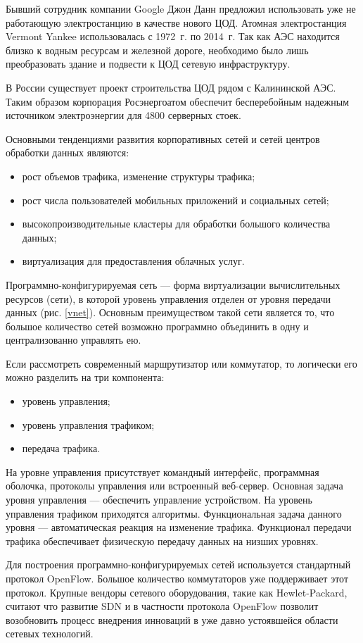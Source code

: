 Бывший сотрудник компании Google Джон Данн предложил использовать уже не работающую электростанцию в качестве нового ЦОД.
Атомная электростанция Vermont Yankee использовалась с 1972~г. по 2014~г.
Так как АЭС находится близко к водным ресурсам и железной дороге, необходимо было лишь преобразовать здание и подвести к ЦОД сетевую инфраструктуру.

В России существует проект строительства ЦОД рядом с Калининской АЭС.
Таким образом корпорация Росэнергоатом обеспечит бесперебойным надежным источником электроэнергии для 4800 серверных стоек.

Основными тенденциями развития корпоративных сетей и сетей центров обработки данных являются:
\begin{itemize}
  \item рост объемов трафика, изменение структуры трафика;
  \item рост числа пользователей мобильных приложений и социальных сетей;
  \item высокопроизводительные кластеры для обработки большого количества данных;
  \item виртуализация для предоставления облачных услуг.
\end{itemize}

Программно-конфигурируемая сеть --- форма виртуализации вычислительных ресурсов (сети), в которой уровень управления отделен от уровня передачи данных (рис. \ref{vnet}).
Основным преимуществом такой сети является то, что большое количество сетей возможно программно объединить в одну и централизованно управлять ею.


Если рассмотреть современный маршрутизатор или коммутатор, то логически его можно разделить на три компонента:
\begin{itemize}
  \item уровень управления;
  \item уровень управления трафиком;
  \item передача трафика.
\end{itemize}

На уровне управления присутствует командный интерфейс, программная оболочка, протоколы управления или встроенный веб-сервер.
Основная задача уровня управления --- обеспечить управление устройством.
На уровень управления трафиком приходятся алгоритмы.
Функциональная задача данного уровня --- автоматическая реакция на изменение трафика.
Функционал передачи трафика обеспечивает физическую передачу данных на низших уровнях.

Для построения программно-конфигурируемых сетей используется стандартный протокол OpenFlow.
Большое количество коммутаторов уже поддерживает этот протокол.
Крупные вендоры сетевого оборудования, такие как Hewlet-Packard, считают что развитие SDN и в частности протокола OpenFlow позволит возобновить процесс внедрения инноваций в уже давно устоявшейся области сетевых технологий.

\clearpage
